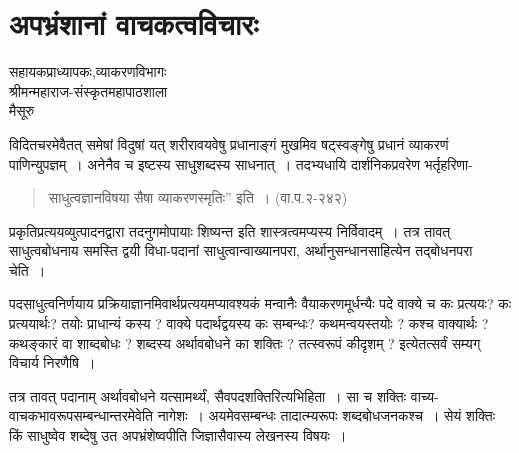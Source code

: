 {\fontsize{15}{17}\selectfont
\presetvalues
\chapter{अपभ्रंशानां वाचकत्वविचारः}

\begin{center}
\smallskip

सहायकप्राध्यापकः,व्याकरणविभागः\\
श्रीमन्महाराज-संस्कृतमहापाठशाला\\
मैसूरु
\addrule
\end{center}

विदितचरमेवैतत् समेषां विदुषां यत् शरीरावयवेषु प्रधानाङ्गं मुखमिव षट्स्वङ्गेषु प्रधानं व्याकरणं पाणिन्युपज्ञम्~। अनेनैव च इष्टस्य साधुशब्दस्य साधनात्~। तदभ्यधायि दार्शनिकप्रवरेण भर्तृहरिणा-
\begin{verse}
साधुत्वज्ञानविषया सैषा व्याकरणस्मृतिः” इति~। (वा.प.२-२४२)
\end{verse}
प्रकृतिप्रत्ययव्युत्पादनद्वारा तदनुगमोपायाः शिष्यन्त इति शास्त्रत्वमप्यस्य निर्विवादम्~। तत्र तावत् साधुत्वबोधनाय समस्ति द्वयी विधा-पदानां साधुत्वान्वाख्यानपरा, अर्थानुसन्धान\-साहित्येन तद्बोधनपरा चेति~। 

पदसाधुत्वनिर्णयाय प्रक्रियाज्ञानमिवार्थप्रत्ययमप्यावश्यकं मन्वानैः वैयाकरणमूर्धन्यैः पदे वाक्ये च कः प्रत्ययः? कः प्रत्ययार्थः? तयोः प्राधान्यं कस्य ? वाक्ये पदार्थद्वयस्य कः सम्बन्धः? कथमन्वयस्तयोः ? कश्च वाक्यार्थः ? कथङ्कारं वा शाब्दबोधः ? शब्दस्य अर्थावबोधने का शक्तिः ? तत्स्वरूपं कीदृशम् ? इत्येतत्सर्वं सम्यग् विचार्य निरणैषि~।  

तत्र तावत् पदानाम् अर्थावबोधने यत्सामर्थ्यं, सैवपदशक्तिरित्यभिहिता~। सा च शक्तिः वाच्य-वाचकभावरूपसम्बन्धान्तरमेवेति नागेशः~। अयमेवसम्बन्धः तादात्म्यरूपः शब्दबोधजनकश्च~। सेयं शक्तिः किं साधुष्वेव शब्देषु उत अपभ्रंशेष्वपीति जिज्ञासैवास्य लेखनस्य विषयः~। 

}
